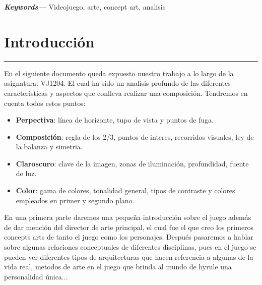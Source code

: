 \documentclass[12pt]{article}
\providecommand{\keywords}[1]
{
  \small
  \textbf{\textit{Keywords---}} #1
}
\begin{document}
\keywords{Videojuego, arte, concept art, analisis}

\newpage
\tableofcontents
\setcounter{tocdepth}{4}

\newpage
\newpage
\renewcommand{\listfigurename}{Lita de figuras}
\thispagestyle{empty}
\listoffigures


\newpage
\section{Introducción}
    \hrule
\vspace{1cm}
    En el siguiente documento queda expuesto nuestro trabajo a lo largo de la asignatura: VJ1204. El cual ha sido un analisis profundo de las diferentes caracteristicas y aspectos que conlleva realizar una composición. Tendremos en cuenta todos estos puntos:
    \begin{itemize}
        \item \textbf{Perpectiva}: línea de horizonte, tupo de vista y puntos de fuga.
        \item \textbf{Composición}: regla de los 2/3, puntos de interes, recorridos visuales, ley de la balanza y simetria.
        \item \textbf{Claroscuro}: clave de la imagen, zonas de iluminación, profundidad, fuente de luz.
        \item \textbf{Color}: gama de colores, tonalidad general, tipos de contraste y colores empleados en primer y segundo plano.
    \end{itemize}

    En una primera parte daremos una pequeña introducción sobre el juego además de dar mención del director de arte principal, el cual fue el que creo los primeros concepts arts de tanto el juego como los personajes. Después pasaremos a hablar sobre algunas relaciones conceptuales de diferentes disciplinas, pues en el juego se pueden ver diferentes tipos de arquitecturas que hacen referencia a algunas de la vida real, metodos de arte en el juego que brinda al mundo de hyrule una personalidad única...
\end{document}
